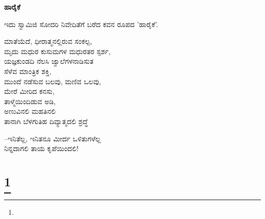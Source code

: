 \selectkan

\begin{center}
\textbf{ಹಾರೈಕೆ}
\end{center}

\begin{center}
ಇದು ಸ್ವಾಮಿಜಿ ಸೋದರಿ ನಿವೇದಿತೆಗೆ ಬರೆದ ಕವನ ರೂಪದ 'ಹಾರೈಕೆ'.
\end{center}

\begin{myquote}
ಮಾತೆಯೆದೆ, ಧೀರಾತ್ಮನಲ್ಲಿರುವ ಸಂಕಲ್ಪ,\\ಮೃದು ಮಧುರ ಕುಸುಮಗಳ ಮಧುರತರ ಸ್ಪರ್ಶ,\\ಯಜ್ಞಕುಂಡದಿ ನೆಲಸಿ ಜ್ವಾಲೆಗಳನಾಡಿಸುತ\\ಸೆಳೆವ ಮಾಂತ್ರಿಕ ಶಕ್ತಿ,\\ಮುಂದೆ ನಡೆಸುವ ಬಲವು, ಮಣಿವ ಒಲವು,\\ಮೇರೆ ಮೀರಿದ ಕನಸು,\\ತಾಳ್ಮೆಯಿಂದಿಡುವ ಅಡಿ,\\ಅಣುವಿನಲಿ ಮಹತಿನಲಿ\\ತಾನಾಗಿ ಬೆಳಗುತಿಹ ದಿವ್ಯಾತ್ಮದಲಿ ಶ್ರದ್ಧೆ
\end{myquote}

\begin{myquote}
–ಇನಿತೆಲ್ಲ, ಇನಿತನೂ ಮೀರ್ದ ಒಳಿತುಗಳೆಲ್ಲ\\ನಿನ್ನದಾಗಲಿ ತಾಯ ಕೃಪೆಯಿಂದಲಿ!
\end{myquote}

\selecteng

\chapter[REQUIESCAT IN PACE]{\protect\footnote{}}

\begin{myquote}
\end{myquote}

\begin{myquote}
\end{myquote}

